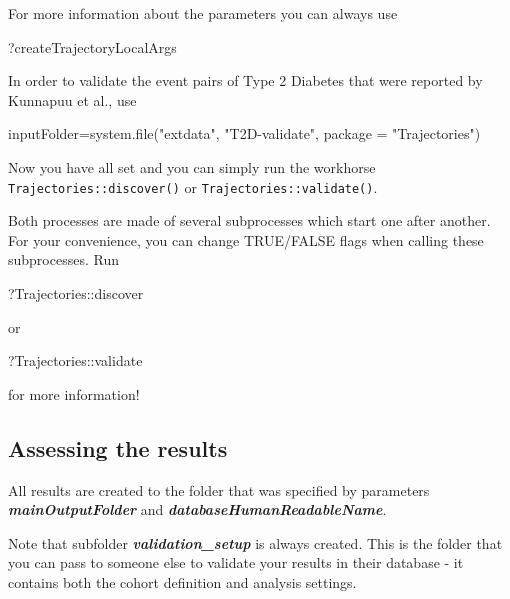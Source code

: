 \documentclass[
]{article}
\newenvironment{Shaded}{\begin{snugshade}}{\end{snugshade}}
\newcommand{\AttributeTok}[1]{\textcolor[rgb]{0.77,0.63,0.00}{#1}}
\newcommand{\FunctionTok}[1]{\textcolor[rgb]{0.00,0.00,0.00}{#1}}
\newcommand{\NormalTok}[1]{#1}
\newcommand{\OtherTok}[1]{\textcolor[rgb]{0.56,0.35,0.01}{#1}}
\newcommand{\SpecialCharTok}[1]{\textcolor[rgb]{0.00,0.00,0.00}{#1}}
\newcommand{\StringTok}[1]{\textcolor[rgb]{0.31,0.60,0.02}{#1}}
\begin{document}
For more information about the parameters you can always use

\begin{Shaded}
\begin{Highlighting}[]
\NormalTok{?createTrajectoryLocalArgs}
\end{Highlighting}
\end{Shaded}

In order to validate the event pairs of Type 2 Diabetes that were
reported by Kunnapuu et al., use

\begin{Shaded}
\begin{Highlighting}[]
\NormalTok{inputFolder}\OtherTok{=}\FunctionTok{system.file}\NormalTok{(}\StringTok{"extdata"}\NormalTok{, }\StringTok{"T2D{-}validate"}\NormalTok{, }\AttributeTok{package =} \StringTok{"Trajectories"}\NormalTok{)}
\end{Highlighting}
\end{Shaded}

Now you have all set and you can simply run the workhorse
\texttt{Trajectories::discover()} or \texttt{Trajectories::validate()}.

Both processes are made of several subprocesses which start one after
another. For your convenience, you can change TRUE/FALSE flags when
calling these subprocesses. Run

\begin{Shaded}
\begin{Highlighting}[]
\NormalTok{?Trajectories}\SpecialCharTok{::}\NormalTok{discover}
\end{Highlighting}
\end{Shaded}

or

\begin{Shaded}
\begin{Highlighting}[]
\NormalTok{?Trajectories}\SpecialCharTok{::}\NormalTok{validate}
\end{Highlighting}
\end{Shaded}

for more information!

\hypertarget{assessing-the-results}{%
\subsection{Assessing the results}\label{assessing-the-results}}

All results are created to the folder that was specified by parameters
\textbf{\emph{mainOutputFolder}} and
\textbf{\emph{databaseHumanReadableName}}.

Note that subfolder \textbf{\emph{validation\_setup}} is always created.
This is the folder that you can pass to someone else to validate your
results in their database - it contains both the cohort definition and
analysis settings.
\end{document}
